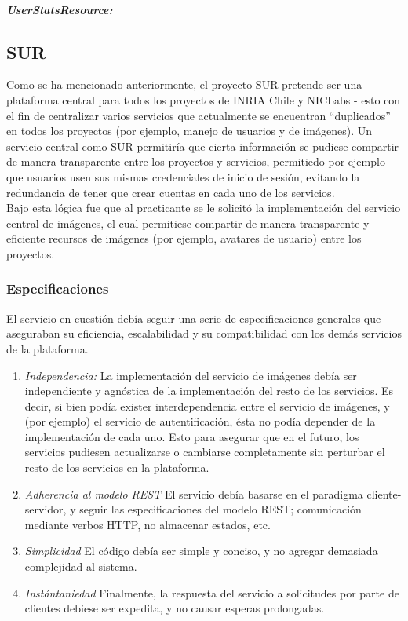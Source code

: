 \documentclass[11pt,letterpaper]{article}
\begin{document}
\subparagraph{UserStatsResource:\\}

\newpage
\subsection{SUR}

Como se ha mencionado anteriormente, el proyecto SUR pretende ser una plataforma central para todos los proyectos de INRIA Chile y NICLabs - esto con el fin de centralizar varios servicios que actualmente se encuentran ``duplicados'' en todos los proyectos (por ejemplo, manejo de usuarios y de imágenes). Un servicio central como SUR permitiría que cierta información se pudiese compartir de manera transparente entre los proyectos y servicios, permitiedo por ejemplo que usuarios usen sus mismas credenciales de inicio de sesión, evitando la redundancia de tener que crear cuentas en cada uno de los servicios.
\\
Bajo esta lógica fue que al practicante se le solicitó la implementación del servicio central de imágenes, el cual permitiese compartir de manera transparente y eficiente recursos de imágenes (por ejemplo, avatares de usuario) entre los proyectos.

\subsubsection{Especificaciones}

El servicio en cuestión debía seguir una serie de especificaciones generales que aseguraban su eficiencia, escalabilidad y su compatibilidad con los demás servicios de la plataforma.

\begin{enumerate}
    \item \emph{Independencia:} \@ La implementación del servicio de imágenes debía ser independiente y agnóstica de la implementación del resto de los servicios. Es decir, si bien podía exister interdependencia entre el servicio de imágenes, y (por ejemplo) el servicio de autentificación, ésta no podía depender de la implementación de cada uno. Esto para asegurar que en el futuro, los servicios pudiesen actualizarse o cambiarse completamente sin perturbar el resto de los servicios en la plataforma.
    \item \emph{Adherencia al modelo REST} \@ El servicio debía basarse en el paradigma cliente-servidor, y seguir las especificaciones del modelo REST; comunicación mediante verbos HTTP, no almacenar estados, etc.
    \item \emph{Simplicidad} \@ El código debía ser simple y conciso, y no agregar demasiada complejidad al sistema.
    \item \emph{Instántaniedad} \@ Finalmente, la respuesta del servicio a solicitudes por parte de clientes debiese ser expedita, y no causar esperas prolongadas.
\end{enumerate}
\end{document}
